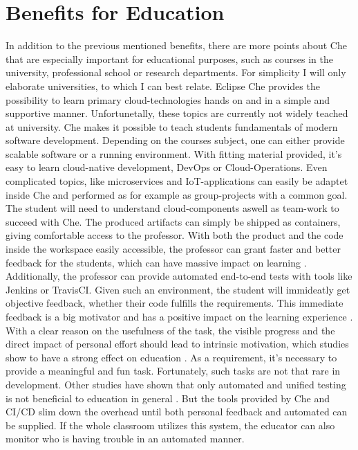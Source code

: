 \documentclass[utf8]{lni}
\begin{document}
\section{Benefits for Education}
\label{sec:EvalEdu}
In addition to the previous mentioned benefits, there are more points about Che that are especially important for educational purposes, such as courses in the university, professional school or research departments.
For simplicity I will only elaborate universities, to which I can best relate.
Eclipse Che provides the possibility to learn primary cloud-technologies hands on and in a simple and supportive manner. 
Unfortunetally, these topics are currently not widely teached at university.
Che makes it possible to teach students fundamentals of modern software development.
Depending on the courses subject, one can either provide scalable software or a running environment. 
With fitting material provided, it's easy to learn cloud-native development, DevOps or Cloud-Operations. 
Even complicated topics, like microservices and IoT-applications can easily be adaptet inside Che \cite{IV18} and performed as for example as group-projects with a common goal. 
The student will need to understand cloud-components aswell as team-work to succeed with Che. 
The produced artifacts can simply be shipped as containers, giving comfortable access to the professor. 
With both the product and the code inside the workspace easily accessible, the professor can grant faster and better feedback for the students, which can have massive impact on learning \cite{HU95}\cite{HU18}.
Additionally, the professor can provide automated end-to-end tests with tools like Jenkins or TravisCI. 
Given such an environment, the student will immideatly get objective feedback, whether their code fulfills the requirements. 
This immediate feedback is a big motivator and has a positive impact on the learning experience \cite{FI05}. 
With a clear reason on the usefulness of the task, the visible progress and the direct impact of personal effort should lead to intrinsic motivation, which studies show to have a strong effect on education \cite{DECI93}. 
As a requirement, it's necessary to provide a meaningful and fun task. 
Fortunately, such tasks are not that rare in development.  
Other studies have shown that only automated and unified testing is not beneficial to education in general \cite{TC88}. 
But the tools provided by Che and CI/CD slim down the overhead until both personal feedback and automated can be supplied. 
If the whole classroom utilizes this system, the educator can also monitor who is having trouble in an automated manner. 
\end{document}
